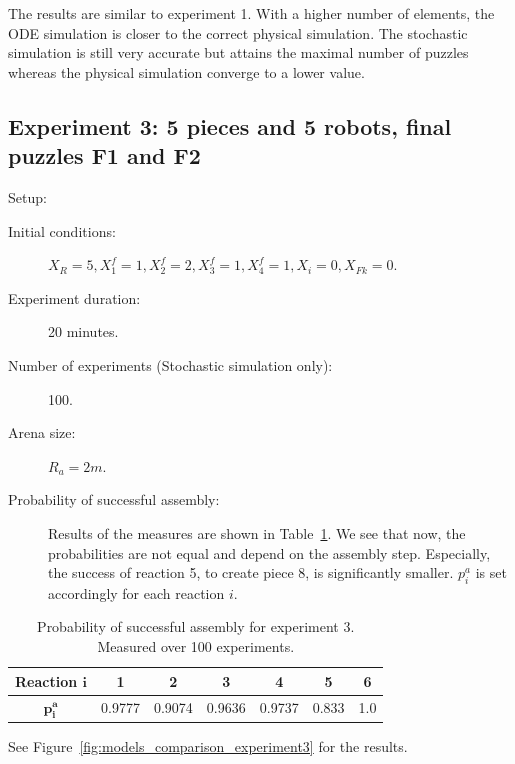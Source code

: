 		The results are similar to experiment 1. With a higher number of elements, the ODE simulation is closer to the correct physical simulation. The stochastic simulation is still very accurate but attains the maximal number of puzzles whereas the physical simulation converge to a lower value.
		
	
	\subsection{Experiment 3: 5 pieces and 5 robots, final puzzles F1 and F2} %
	\label{sub:experiment_3_5_pieces_and_5_robots_final_puzzles_f1_and_f2}
	
		Setup:
		\begin{description}
			\item[Initial conditions:] $X_R = 5, X_1^f=1, X_2^f=2, X_3^f=1, X_4^f=1, X_i=0, X_{Fk}=0$.
			\item[Experiment duration:] 20 minutes.
			\item[Number of experiments (Stochastic simulation only):] 100.
			\item[Arena size:] $R_a = 2m$.
			\item[Probability of successful assembly:] Results of the measures are shown in Table~\ref{tab:assembly_success_experiment3}. We see that now, the probabilities are not equal and depend on the assembly step. Especially, the success of reaction 5, to create piece 8, is significantly smaller. $p^a_i$ is set accordingly for each reaction $i$.
		\end{description}
				
		\begin{table}
			\begin{center}
			\begin{tabular}{|c|c|c|c|c|c|c|}
			 \hline
				\textbf{Reaction} $\mathbf{i}$ & 1 & 2 & 3 & 4 & 5 & 6 \\
			 \hline
				$\mathbf{p^a_i}$ & 0.9777 & 0.9074 & 0.9636 & 0.9737 & 0.833 & 1.0 \\
			 \hline
			\end{tabular}
			\end{center}
			\caption{Probability of successful assembly for experiment 3. Measured over 100 experiments.}
			\label{tab:assembly_success_experiment3}
		\end{table}
		
		See Figure~\ref{fig:models_comparison_experiment3} for the results.
		
